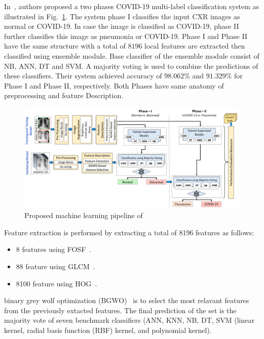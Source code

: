 In~\cite{acos}, authors proposed a two phases COVID-19 multi-label classification system as illustrated in Fig.~\ref{fig:Acos}. The system phase I classifies the input CXR images as normal or COVID-19. In case the image  is classified as COVID-19, phase II further classifies this image as pneumonia or COVID-19. Phase I and Phase II have the same structure with a total of $8196$  local features are extracted then classified using ensemble module. Base classifier of the ensemble module consist of NB, ANN, DT and SVM. A majority voting is used to combine the predictions of these classifiers. Their system achieved accuracy of $98.062$\%  and $91.329$\% for Phase I and Phase II, respectively. Both Phases have same anatomy of preprocessing and feature Description.
\begin{figure}
    \begin{center}
        \includegraphics[width=\textwidth]{Figures/ACoS.png}
        \caption{\label{fig:Acos} Proposed machine learning pipeline of~\cite{acos}}
    \end{center}
\end{figure}
Feature extraction is performed by extracting a total of 8196 features as follows:
\begin{itemize}
    \item 8 features using FOSF~\cite{srinivasan2008statistical}.
    \item 88 feature using GLCM~\cite{gomez2012analysis}.
    \item 8100 feature using HOG~\cite{dalal2005histograms}.
\end{itemize}
binary grey wolf optimization (BGWO)~\cite{mirjalili2014grey} is to select the most relavant features from the previously extacted features. The final prediction of the set is the majority vote of seven benchmark classifiers (ANN, KNN, NB, DT, SVM (linear kernel, radial basis function (RBF) kernel, and polynomial kernel).



